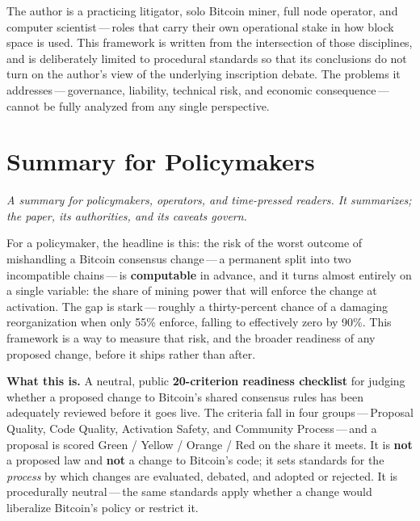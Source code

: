 \documentclass[11pt, twoside, openright]{book}
\begin{document}
The author is a practicing litigator, solo Bitcoin miner, full node operator, and computer scientist\,---\,roles that carry their own operational stake in how block space is used. This framework is written from the intersection of those disciplines, and is deliberately limited to procedural standards so that its conclusions do not turn on the author's view of the underlying inscription debate. The problems it addresses\,---\,governance, liability, technical risk, and economic consequence\,---\,cannot be fully analyzed from any single perspective.

\cleardoublepage

\chapter*{Summary for Policymakers}
{}

{\itshape A summary for policymakers, operators, and time-pressed readers. It summarizes; the paper, its authorities, and its caveats govern.}

\vspace{8pt}

For a policymaker, the headline is this: the risk of the worst outcome of mishandling a Bitcoin consensus change\,---\,a permanent split into two incompatible chains\,---\,is \textbf{computable} in advance, and it turns almost entirely on a single variable: the share of mining power that will enforce the change at activation. The gap is stark\,---\,roughly a thirty-percent chance of a damaging reorganization when only 55\% enforce, falling to effectively zero by 90\%. This framework is a way to measure that risk, and the broader readiness of any proposed change, before it ships rather than after.

\textbf{What this is.} A neutral, public \textbf{20-criterion readiness checklist} for judging whether a proposed change to Bitcoin's shared consensus rules has been adequately reviewed before it goes live. The criteria fall in four groups\,---\,Proposal Quality, Code Quality, Activation Safety, and Community Process\,---\,and a proposal is scored Green / Yellow / Orange / Red on the share it meets. It is \textbf{not} a proposed law and \textbf{not} a change to Bitcoin's code; it sets standards for the \emph{process} by which changes are evaluated, debated, and adopted or rejected. It is procedurally neutral\,---\,the same standards apply whether a change would liberalize Bitcoin's policy or restrict it.
\end{document}
